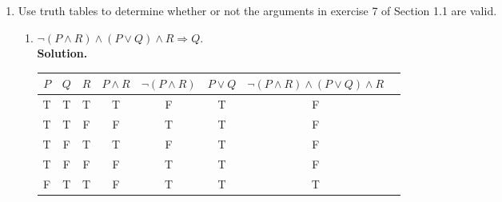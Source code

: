 \documentclass{report}
\newcommand{\sol}{\vspace{1em}\\\textbf{Solution.}\vspace{0.5em}}
\newcommand{\qed}{‎\\‎\hfill$\blacksquare$\vspace{1em}}
\begin{document}
\begin{enumerate}[leftmargin=*]
\begin{enumerate}
              \item Find a formula using only the connectives $\wedge, \vee$, and $\neg$ that is
                    equivalent to $P \mid Q$. \sol{}
                    \[
                        P \mid Q \equiv \neg(P \wedge Q)
                    \] \qed

              \item Find formulas using only the connective | that are equivalent to $\neg P$, $P
                        \vee Q$, and $P \wedge Q$.\sol{}
                    \[
                        \neg P \equiv P \mid P
                    \]
                    \[
                        P \vee Q \equiv \neg P \mid \neg Q \equiv (P \mid P) \mid (Q \mid Q)
                    \]
                    \[
                        P \wedge Q \equiv \neg(P \mid Q) \equiv (P \mid Q) \mid (P \mid Q)
                    \] \qed
          \end{enumerate}
    \item Use truth tables to determine whether or not the arguments in exercise 7 of
          Section 1.1 are valid.
          \begin{enumerate}
              \item $\neg(P \wedge R) \wedge (P \vee Q) \wedge
                        R \Rightarrow Q$.
                    \sol{}
                    \begin{center}
                        \begin{tabular}{cccccccc}
                            $P$ & $Q$ & $R$ & $P \wedge R$ & $\neg(P \wedge R)$ & $P \vee Q$ & $\neg(P \wedge R) \wedge (P \vee Q) \wedge R$ \\
                            \hline
                            T   & T   & T   & T            & F                  & T          & F                                             \\
                            T   & T   & F   & F            & T                  & T          & F                                             \\
                            T   & F   & T   & T            & F                  & T          & F                                             \\
                            T   & F   & F   & F            & T                  & T          & F                                             \\
                            F   & T   & T   & F            & T                  & T          & T                                             \\

\end{tabular}
\end{center}
\end{enumerate}
\end{enumerate}
\end{document}
